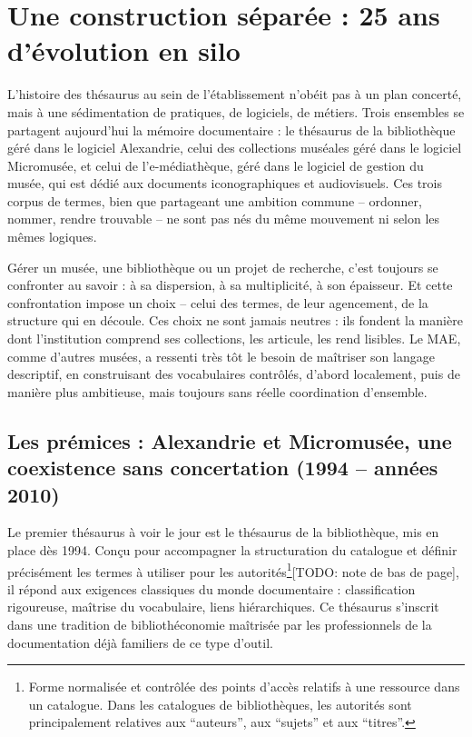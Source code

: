 \section{\label{II-A-1}Une construction séparée : 25 ans d'évolution en silo}

L’histoire des thésaurus au sein de l’établissement n’obéit pas à un plan concerté, mais à une sédimentation de pratiques, de logiciels, de métiers. Trois ensembles se partagent aujourd’hui la mémoire documentaire : le thésaurus de la bibliothèque géré dans le logiciel Alexandrie, celui des collections muséales géré dans le logiciel Micromusée, et celui de l’e-médiathèque, géré dans le logiciel de gestion du musée, qui est dédié aux documents iconographiques et audiovisuels. Ces trois corpus de termes, bien que partageant une ambition commune – ordonner, nommer, rendre trouvable – ne sont pas nés du même mouvement ni selon les mêmes logiques.

Gérer un musée, une bibliothèque ou un projet de recherche, c’est toujours se confronter au savoir : à sa dispersion, à sa multiplicité, à son épaisseur. Et cette confrontation impose un choix – celui des termes, de leur agencement, de la structure qui en découle. Ces choix ne sont jamais neutres : ils fondent la manière dont l’institution comprend ses collections, les articule, les rend lisibles. Le MAE, comme d’autres musées, a ressenti très tôt le besoin de maîtriser son langage descriptif, en construisant des vocabulaires contrôlés, d’abord localement, puis de manière plus ambitieuse, mais toujours sans réelle coordination d’ensemble.

\subsection{Les prémices : Alexandrie et Micromusée, une coexistence sans concertation (1994 – années 2010)}

Le premier thésaurus à voir le jour est le thésaurus de la bibliothèque, mis en place dès 1994. Conçu pour accompagner la structuration du catalogue et définir précisément les termes à utiliser pour les autorités\footnote{Forme normalisée et contrôlée des points d’accès relatifs à une ressource dans un catalogue. Dans les catalogues de bibliothèques, les autorités sont principalement relatives aux “auteurs”, aux “sujets” et aux “titres”.}[TODO: note de bas de page], il répond aux exigences classiques du monde documentaire : classification rigoureuse, maîtrise du vocabulaire, liens hiérarchiques. Ce thésaurus s’inscrit dans une tradition de bibliothéconomie maîtrisée par les professionnels de la documentation déjà familiers de ce type d’outil.

